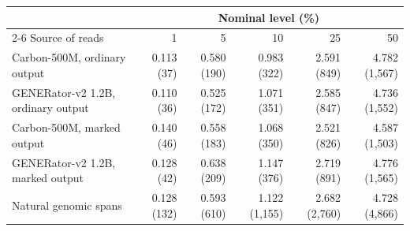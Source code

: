 \begin{tabular}{@{}l rrrrr@{}}
\toprule
& \multicolumn{5}{c}{Nominal level (\%)} \\
\cmidrule(l){2-6}
Source of reads & 1 & 5 & 10 & 25 & 50 \\
\midrule
Carbon-500M, ordinary output & 0.113 (37) & 0.580 (190) & 0.983 (322) & 2.591 (849) & 4.782 (1{,}567) \\
GENERator-v2 1.2B, ordinary output & 0.110 (36) & 0.525 (172) & 1.071 (351) & 2.585 (847) & 4.736 (1{,}552) \\
Carbon-500M, marked output & 0.140 (46) & 0.558 (183) & 1.068 (350) & 2.521 (826) & 4.587 (1{,}503) \\
GENERator-v2 1.2B, marked output & 0.128 (42) & 0.638 (209) & 1.147 (376) & 2.719 (891) & 4.776 (1{,}565) \\
Natural genomic spans & 0.128 (132) & 0.593 (610) & 1.122 (1{,}155) & 2.682 (2{,}760) & 4.728 (4{,}866) \\
\bottomrule
\end{tabular}
